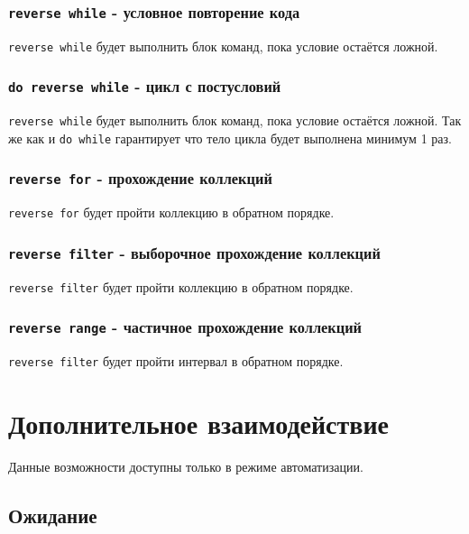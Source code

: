 \documentclass[a4paper, 14pt]{extarticle}
\begin{document}
\subsubsection{\lstinline|reverse while| - условное повторение кода}

\lstinline|reverse while| будет выполнить блок команд, пока условие остаётся ложной.

\subsubsection{\lstinline|do reverse while| - цикл с постусловий}

\lstinline|reverse while| будет выполнить блок команд, пока условие остаётся ложной. Так же как и \lstinline|do while| гарантирует что тело цикла будет выполнена минимум 1 раз.

\subsubsection{\lstinline|reverse for| - прохождение коллекций}

\lstinline|reverse for| будет пройти коллекцию в обратном порядке.

\subsubsection{\lstinline|reverse filter| - выборочное прохождение коллекций}

\lstinline|reverse filter| будет пройти коллекцию в обратном порядке.

\subsubsection{\lstinline|reverse range| - частичное прохождение коллекций}

\lstinline|reverse filter| будет пройти интервал в обратном порядке.

\newpage
\section{Дополнительное взаимодействие}

Данные возможности доступны только в режиме автоматизации.

\subsection{Ожидание}
\end{document}
